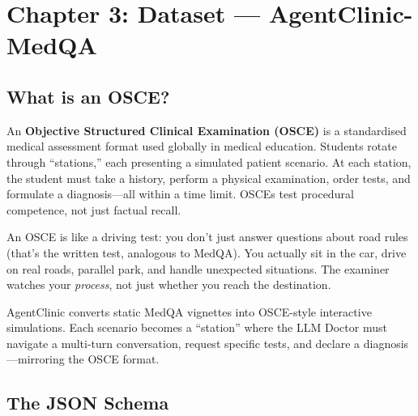 \section{Chapter 3: Dataset --- AgentClinic-MedQA}
\label{ch:dataset}

\subsection{What is an OSCE?}

\begin{acadbox}[\textcolor{white}{Academic Definition}]
An \textbf{Objective Structured Clinical Examination (OSCE)} is a standardised medical assessment format used globally in medical education. Students rotate through ``stations,'' each presenting a simulated patient scenario. At each station, the student must take a history, perform a physical examination, order tests, and formulate a diagnosis---all within a time limit. OSCEs test procedural competence, not just factual recall.
\end{acadbox}

\begin{analogybox}[\textcolor{white}{Simple Analogy}]
An OSCE is like a driving test: you don't just answer questions about road rules (that's the written test, analogous to MedQA). You actually sit in the car, drive on real roads, parallel park, and handle unexpected situations. The examiner watches your \textit{process}, not just whether you reach the destination.
\end{analogybox}

\begin{mattersbox}[\textcolor{white}{Why It Matters for This Thesis}]
AgentClinic converts static MedQA vignettes into OSCE-style interactive simulations. Each scenario becomes a ``station'' where the LLM Doctor must navigate a multi-turn conversation, request specific tests, and declare a diagnosis---mirroring the OSCE format.
\end{mattersbox}

\subsection{The JSON Schema}

